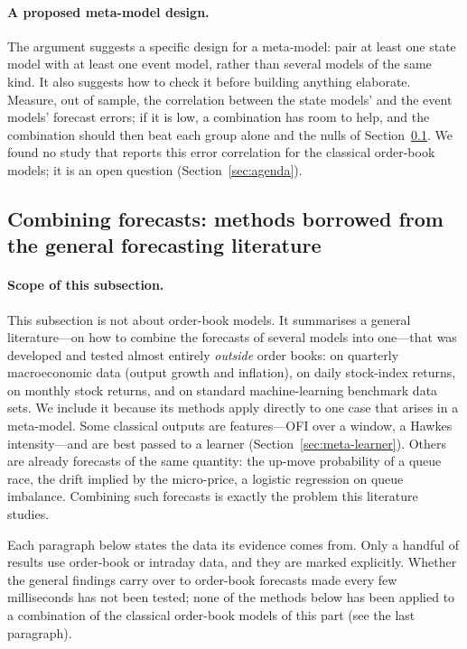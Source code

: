 \paragraph{A proposed meta-model design.} The argument suggests a specific design for a meta-model: pair at least one
state model with at least one event model, rather than several models of the same kind. It also suggests
how to check it before building anything elaborate. Measure, out of sample, the correlation between the
state models' and the event models' forecast errors; if it is low, a combination has room to help, and the
combination should then beat each group alone and the nulls of Section~\ref{sec:meta-combine}. We found no
study that reports this error correlation for the classical order-book models; it is an open question
(Section~\ref{sec:agenda}).

\subsection{Combining forecasts: methods borrowed from the general forecasting literature}
\label{sec:meta-combine}

\paragraph{Scope of this subsection.} This subsection is not about order-book models. It
summarises a general literature---on how to combine the forecasts of several models into one---that was
developed and tested almost entirely \emph{outside} order books: on quarterly macroeconomic data (output
growth and inflation), on daily stock-index returns, on monthly stock returns, and on standard
machine-learning benchmark data sets. We include it because its methods apply directly to one case that
arises in a meta-model. Some classical outputs are features---OFI over a window, a Hawkes intensity---and
are best passed to a learner (Section~\ref{sec:meta-learner}). Others are already forecasts of the same
quantity: the up-move probability of a queue race, the drift implied by the micro-price, a logistic
regression on queue imbalance. Combining such forecasts is exactly the problem this literature studies.

Each paragraph below states the data its evidence comes from. Only a handful of results use order-book or
intraday data, and they are marked explicitly. Whether the general findings carry over to order-book
forecasts made every few milliseconds has not been tested; none of the methods below has been applied to
a combination of the classical order-book models of this part (see the last paragraph).

